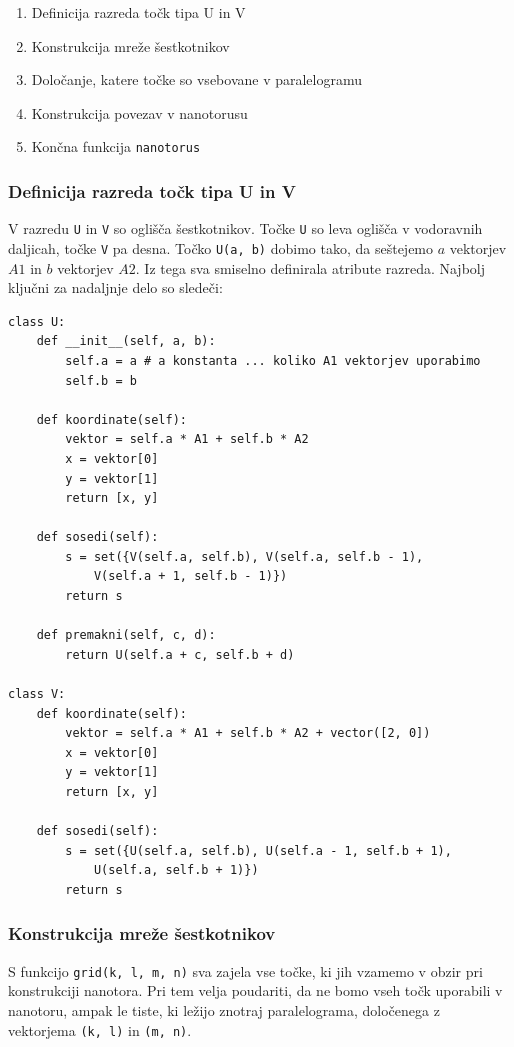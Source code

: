 \documentclass[a4paper, 10 pt, titlepage]{article}
\begin{document}
\begin{enumerate}
\item Definicija razreda točk tipa U in V
\item Konstrukcija mreže šestkotnikov
\item Določanje, katere točke so vsebovane v paralelogramu
\item Konstrukcija povezav v nanotorusu
\item Končna funkcija \texttt{nanotorus}
\end{enumerate}

\subsubsection{Definicija razreda točk tipa U in V}

V razredu \texttt{U} in \texttt{V} so oglišča šestkotnikov. Točke \texttt{U} so leva oglišča v vodoravnih daljicah, točke \texttt{V} pa desna. Točko \texttt{U(a, b)} dobimo tako, da seštejemo $a$ vektorjev $A1$ in $b$ vektorjev $A2$. Iz tega sva smiselno definirala atribute razreda. Najbolj ključni za nadaljnje delo so sledeči:

\begin{verbatim}
class U:
    def __init__(self, a, b):
        self.a = a # a konstanta ... koliko A1 vektorjev uporabimo
        self.b = b

    def koordinate(self):
        vektor = self.a * A1 + self.b * A2
        x = vektor[0]
        y = vektor[1]
        return [x, y]

    def sosedi(self):
        s = set({V(self.a, self.b), V(self.a, self.b - 1), 
        	V(self.a + 1, self.b - 1)})
        return s
    
    def premakni(self, c, d):
        return U(self.a + c, self.b + d)

class V:       
    def koordinate(self):
        vektor = self.a * A1 + self.b * A2 + vector([2, 0])
        x = vektor[0]
        y = vektor[1]
        return [x, y]
    
    def sosedi(self):
        s = set({U(self.a, self.b), U(self.a - 1, self.b + 1), 
        	U(self.a, self.b + 1)})
        return s
\end{verbatim}

\subsubsection{Konstrukcija mreže šestkotnikov}

S funkcijo \texttt{grid(k, l, m, n)} sva zajela vse točke, ki jih vzamemo v obzir pri konstrukciji nanotora. Pri tem velja poudariti, da ne bomo vseh točk uporabili v nanotoru, ampak le tiste, ki ležijo znotraj paralelograma, določenega z vektorjema \texttt{(k, l)} in \texttt{(m, n)}. 
\end{document}
